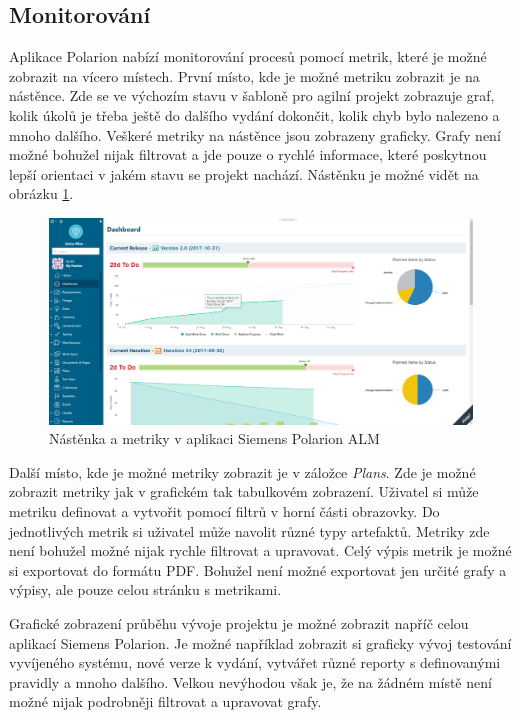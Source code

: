 \documentclass[czech,master]{diploma}
\begin{document}
\subsection{Monitorování}
Aplikace Polarion nabízí monitorování procesů pomocí metrik, které je možné zobrazit na vícero místech. První místo, kde je možné metriku zobrazit je na nástěnce. Zde se ve výchozím stavu v šabloně pro agilní projekt zobrazuje graf, kolik úkolů je třeba ještě do dalšího vydání dokončit, kolik chyb bylo nalezeno a mnoho dalšího. Veškeré metriky na nástěnce jsou zobrazeny graficky. Grafy není možné bohužel nijak filtrovat a jde pouze o rychlé informace, které poskytnou lepší orientaci v jakém stavu se projekt nachází. Nástěnku je možné vidět na obrázku \ref{fig:polarion_dashboard}.

\begin{figure}[!ht]
    \centering
    \includegraphics[width=1\textwidth]{Diplomka/Figures/polarion_dashboard.png}
    \caption{Nástěnka a metriky v aplikaci Siemens Polarion ALM}
    \label{fig:polarion_dashboard}
\end{figure}

Další místo, kde je možné metriky zobrazit je v záložce \textit{Plans}. Zde je možné zobrazit metriky jak v grafickém tak tabulkovém zobrazení. Uživatel si může metriku definovat a vytvořit pomocí filtrů v horní části obrazovky. Do jednotlivých metrik si uživatel může navolit různé typy artefaktů. Metriky zde není bohužel možné nijak rychle filtrovat a upravovat. Celý výpis metrik je možné si exportovat do formátu PDF. Bohužel není možné exportovat jen určité grafy a výpisy, ale pouze celou stránku s metrikami.

Grafické zobrazení průběhu vývoje projektu je možné zobrazit napříč celou aplikací Siemens Polarion. Je možné například zobrazit si graficky vývoj testování vyvíjeného systému, nové verze k vydání, vytvářet různé reporty s definovanými pravidly a mnoho dalšího. Velkou nevýhodou však je, že na žádném místě není možné nijak podrobněji filtrovat a upravovat grafy.
\end{document}
